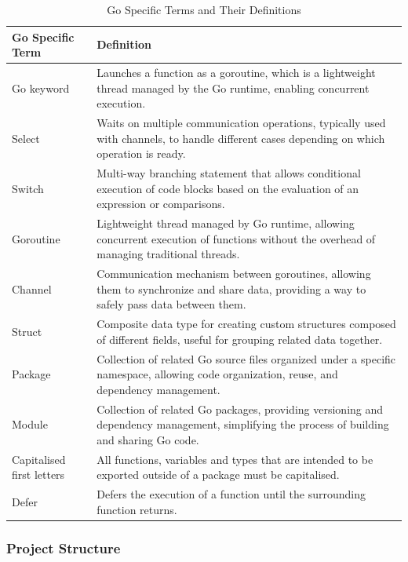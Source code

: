 \documentclass[12pt, conference, final, a4paper, onecolumn, compsoc]{IEEEtran}
\begin{document}
\begin{table}[H]
  \centering
  \begin{tabular}{|l|p{}|}
    \hline
    \textbf{Go Specific Term} & \textbf{Definition} \\
    \hline
    Go keyword & Launches a function as a goroutine, which is a lightweight thread managed by the Go runtime, enabling concurrent execution. \\
    \hline
    Select    & Waits on multiple communication operations, typically used with channels, to handle different cases depending on which operation is ready. \\
    \hline
    Switch    & Multi-way branching statement that allows conditional execution of code blocks based on the evaluation of an expression or comparisons. \\
    \hline
    Goroutine & Lightweight thread managed by Go runtime, allowing concurrent execution of functions without the overhead of managing traditional threads. \\
    \hline
    Channel   & Communication mechanism between goroutines, allowing them to synchronize and share data, providing a way to safely pass data between them. \\
    \hline
    Struct    & Composite data type for creating custom structures composed of different fields, useful for grouping related data together. \\
    \hline
    Package   & Collection of related Go source files organized under a specific namespace, allowing code organization, reuse, and dependency management. \\
    \hline
    Module    & Collection of related Go packages, providing versioning and dependency management, simplifying the process of building and sharing Go code. \\
    \hline
    Capitalised first letters & All functions, variables and types that are
                                intended to be exported outside of a package must be capitalised. \\
    \hline
    Defer & Defers the execution of a function until the surrounding function returns. \\
    \hline
  \end{tabular}
  \caption{Go Specific Terms and Their Definitions}
  \label{table:go-terms}
\end{table}

\subsubsection*{Project Structure}
\end{document}
